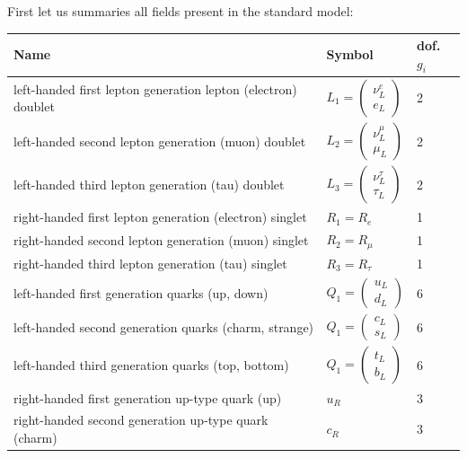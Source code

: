 \documentclass[master,       %
               twoside,        %
               BCOR10mm,       %
               english,ngerman, %
               ]{GAUBM}
\begin{document}
\begin{otherlanguage}{english}
First let us summaries all fields present in the standard model:
\begin{table}[H]
	\begin{center}
		\begin{tabular}{lll}
			Name & Symbol & dof. $g_i$ \\ \hline \hline \hline
			left-handed first lepton generation lepton (electron) doublet & $L_1 = \begin{pmatrix}
				\nu^e_L \\
				e_L
			\end{pmatrix}$ & 2 \\
			left-handed second lepton generation (muon) doublet & $L_2 = \begin{pmatrix}
				\nu^\mu_L \\
				\mu_L
			\end{pmatrix}$ & 2 \\
			left-handed third lepton generation (tau) doublet & $L_3 = \begin{pmatrix}
				\nu^\tau_L \\
				\tau_L
			\end{pmatrix}$ & 2 \\
			\hline
			right-handed first lepton generation (electron) singlet & $R_1 = R_e$ & 1 \\
			right-handed second lepton generation (muon) singlet & $R_2 = R_\mu$ & 1 \\
			right-handed third lepton generation (tau) singlet & $R_3 = R_\tau$ & 1 \\
			\hline \hline
			left-handed first generation quarks (up, down) & $Q_1 = \begin{pmatrix}
				u_L \\
				d_L
			\end{pmatrix} $ & 6 \\
			left-handed second generation quarks (charm, strange) & $Q_1 = \begin{pmatrix}
				c_L \\
				s_L
			\end{pmatrix} $ & 6 \\
		    left-handed third generation quarks (top, bottom) & $Q_1 = \begin{pmatrix}
		    	t_L \\
		    	b_L
		    \end{pmatrix} $ & 6 \\
	    	\hline
	    	right-handed first generation up-type quark (up) & $u_R$ & 3 \\
	    	right-handed second generation up-type quark (charm) & $c_R$ & 3 \\

\end{tabular}
\end{center}
\end{table}
\end{otherlanguage}
\end{document}
